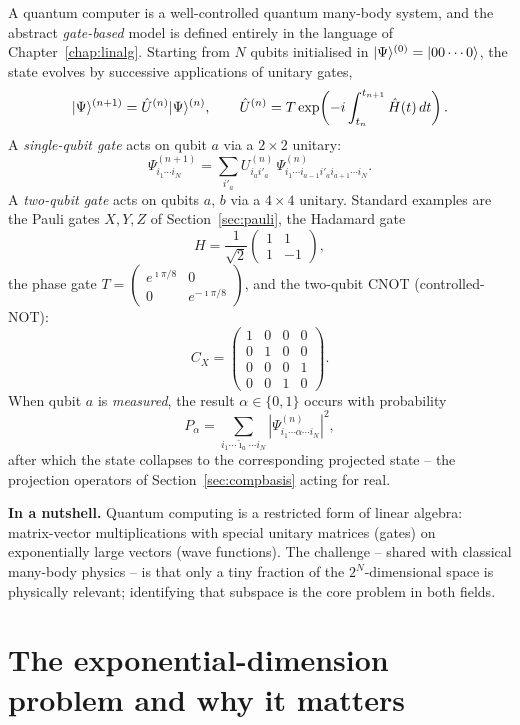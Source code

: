 A quantum computer is a well-controlled quantum many-body system, and the
abstract \emph{gate-based} model is defined entirely in the language of
Chapter~\ref{chap:linalg}.  Starting from $N$ qubits initialised in
$\vert \Psi \rangle^{(0)}=\vert 00\cdots0 \rangle$, the state evolves by successive
applications of unitary gates,
\[
  \vert \Psi \rangle^{(n+1)}=\hat{U}^{(n)}\vert \Psi \rangle^{(n)},\qquad
  \hat{U}^{(n)}=T\exp\!\left(-i\int_{t_n}^{t_{n+1}}\hat{H}(t)\,dt\right).
\]
A \emph{single-qubit gate} acts on qubit $a$ via a $2\times 2$ unitary:
\[
  \Psi_{i_1\cdots i_N}^{(n+1)}
  =\sum_{i'_a}U^{(n)}_{i_a i'_a}\,
   \Psi_{i_1\cdots i_{a-1}i'_a i_{a+1}\cdots i_N}^{(n)}.
\]
A \emph{two-qubit gate} acts on qubits $a$, $b$ via a $4\times 4$
unitary.  Standard examples are the Pauli gates $X,Y,Z$ of
Section~\ref{sec:pauli}, the Hadamard gate
\[
  H=\frac{1}{\sqrt{2}}\begin{pmatrix}1&1\\1&-1\end{pmatrix},
\]
the phase gate
$T=\begin{pmatrix}e^{\imath\pi/8}&0\\0&e^{-\imath\pi/8}\end{pmatrix}$,
and the two-qubit CNOT (controlled-NOT):
\[
  C_X=\begin{pmatrix}1&0&0&0\\0&1&0&0\\0&0&0&1\\0&0&1&0\end{pmatrix}.
\]
When qubit $a$ is \emph{measured}, the result $\alpha\in\{0,1\}$
occurs with probability
\[
  P_\alpha
  =\sum_{i_1\cdots\hat{\imath}_a\cdots i_N}
   \left|\Psi_{i_1\cdots\alpha\cdots i_N}^{(n)}\right|^2,
\]
after which the state collapses to the corresponding projected state -- the
projection operators of Section~\ref{sec:compbasis} acting for real.

\begin{notebox}
\textbf{In a nutshell.} Quantum computing is a restricted form of
linear algebra: matrix-vector multiplications with special unitary
matrices (gates) on exponentially large vectors (wave functions).
The challenge -- shared with classical many-body physics -- is that
only a tiny fraction of the $2^N$-dimensional space is physically
relevant; identifying that subspace is the core problem in both fields.
\end{notebox}

\section{The exponential-dimension problem and why it matters}
\label{sec:expdim}


